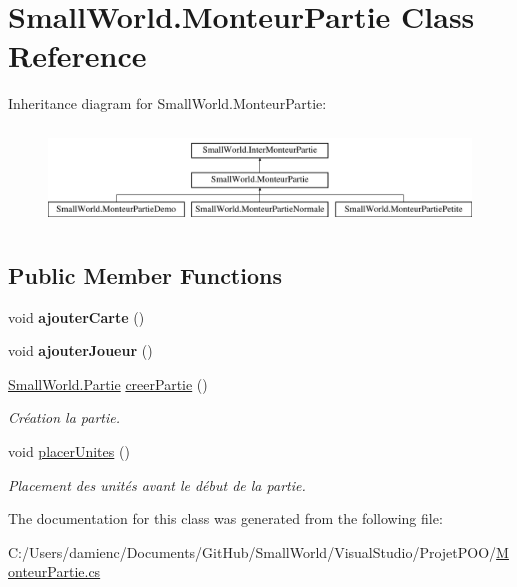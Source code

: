 \hypertarget{class_small_world_1_1_monteur_partie}{\section{Small\-World.\-Monteur\-Partie Class Reference}
\label{class_small_world_1_1_monteur_partie}
}
Inheritance diagram for Small\-World.\-Monteur\-Partie\-:\begin{figure}[H]
\begin{center}
\leavevmode
\includegraphics[height=2.616822cm]{class_small_world_1_1_monteur_partie}
\end{center}
\end{figure}
\subsection*{Public Member Functions}
\begin{DoxyCompactItemize}
\item 
\hypertarget{class_small_world_1_1_monteur_partie_ad64e720f9f051d0f17eb134d0c112e73}{void {\bfseries ajouter\-Carte} ()}\label{class_small_world_1_1_monteur_partie_ad64e720f9f051d0f17eb134d0c112e73}

\item 
\hypertarget{class_small_world_1_1_monteur_partie_a7e2370c4e2de6e0885a18bdcece42e0f}{void {\bfseries ajouter\-Joueur} ()}\label{class_small_world_1_1_monteur_partie_a7e2370c4e2de6e0885a18bdcece42e0f}

\item 
\hypertarget{class_small_world_1_1_monteur_partie_ab77c0f384bbc52765d1462173e03b9b5}{\hyperlink{interface_small_world_1_1_partie}{Small\-World.\-Partie} \hyperlink{class_small_world_1_1_monteur_partie_ab77c0f384bbc52765d1462173e03b9b5}{creer\-Partie} ()}\label{class_small_world_1_1_monteur_partie_ab77c0f384bbc52765d1462173e03b9b5}

\begin{DoxyCompactList}\small\item\em Création la partie. \end{DoxyCompactList}\item 
\hypertarget{class_small_world_1_1_monteur_partie_a0f15d1583b4289efb1ed7e9bba11d897}{void \hyperlink{class_small_world_1_1_monteur_partie_a0f15d1583b4289efb1ed7e9bba11d897}{placer\-Unites} ()}\label{class_small_world_1_1_monteur_partie_a0f15d1583b4289efb1ed7e9bba11d897}

\begin{DoxyCompactList}\small\item\em Placement des unités avant le début de la partie. \end{DoxyCompactList}\end{DoxyCompactItemize}


The documentation for this class was generated from the following file\-:\begin{DoxyCompactItemize}
\item 
C\-:/\-Users/damienc/\-Documents/\-Git\-Hub/\-Small\-World/\-Visual\-Studio/\-Projet\-P\-O\-O/\hyperlink{_monteur_partie_8cs}{Monteur\-Partie.\-cs}\end{DoxyCompactItemize}
